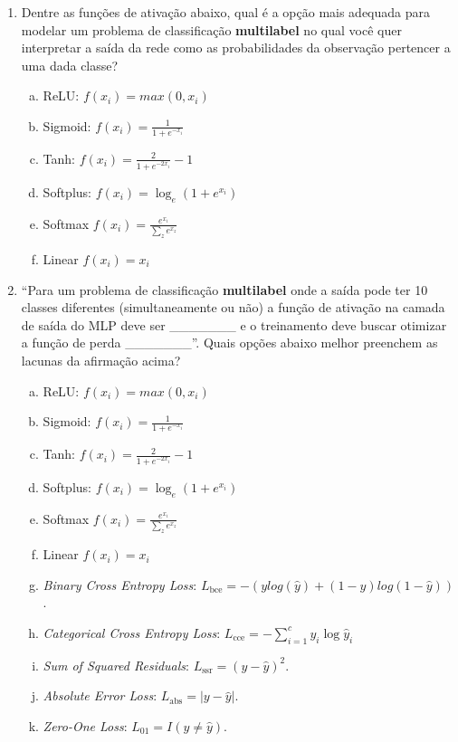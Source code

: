 \documentclass{dlproblemset}
\begin{document}
\begin{enumerate}[1)]
    \item Dentre as funções de ativação abaixo, qual é a opção mais adequada para modelar um problema de classificação \textbf{multilabel} no qual você quer interpretar a saída da rede como as probabilidades da observação pertencer a uma dada classe?
    \begin{enumerate}[(a)]
        \item ReLU: $f(x_{i}) = max(0,x_{i})$
        \item Sigmoid: $f(x_{i}) = \frac{1}{1 + e^{-x_{i}}}$
        \item Tanh: $f(x_{i}) = \frac{2}{1 + e^{-2x_{i}}}-1$
        \item Softplus: $f(x_{i}) = \log_{e}(1 + e^{x_{i}})$
        \item Softmax $f(x_{i}) = \frac{e^{x_{i}}}{\sum_{z} e^{x_{z}}}$
        \item Linear $f(x_{i}) = x_{i}$
    \end{enumerate}

    \item ``Para um problema de classificação \textbf{multilabel} onde a saída pode ter 10 classes diferentes (simultaneamente ou não) a função de ativação na camada de saída do MLP deve ser \_\_\_\_\_\_\_  e o treinamento deve buscar otimizar a função de perda \_\_\_\_\_\_\_''. Quais opções abaixo melhor preenchem as lacunas da afirmação acima?

    \begin{enumerate}[(a)]
        \item ReLU: $f(x_{i}) = max(0,x_{i})$
        \item Sigmoid: $f(x_{i}) = \frac{1}{1 + e^{-x_{i}}}$
        \item Tanh: $f(x_{i}) = \frac{2}{1 + e^{-2x_{i}}}-1$
        \item Softplus: $f(x_{i}) = \log_{e}(1 + e^{x_{i}})$
        \item Softmax $f(x_{i}) = \frac{e^{x_{i}}}{\sum_{z} e^{x_{z}}}$
        \item Linear $f(x_{i}) = x_{i}$
	    \item \textit{Binary Cross Entropy Loss}: $L_{\text{bce}} = -(ylog(\hat{y}) + (1 - y)log(1-\hat{y}))$.
	    \item \textit{Categorical Cross Entropy Loss}: $L_{\text{cce}} = - \sum_{i=1}^{c}y_{i}\log\hat{y}_{i}$
	    \item \textit{Sum of Squared Residuals}: $L_{\text{ssr}} = (y - \hat{y})^{2}$.
	    \item \textit{Absolute Error Loss}: $L_{\text{abs}} = \left |y - \hat{y}\right|$.
	    \item \textit{Zero-One Loss}: $L_{01} = I(y \neq \hat{y})$.
    \end{enumerate}


\end{enumerate}
\end{document}
